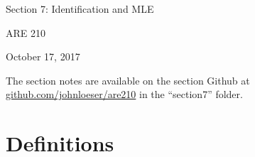 \documentclass[12pt,english]{article}
\begin{document}
\begin{center}
{\Large{}Section 7: Identification and MLE}
\par\end{center}{\Large \par}

\begin{center}
ARE 210
\par\end{center}

\begin{center}
October 17, 2017
\par\end{center}

The section notes are available on the section Github at \href{github.com/johnloeser/are210}{github.com/johnloeser/are210} in the ``section7'' folder.

\section{Definitions}
\end{document}
